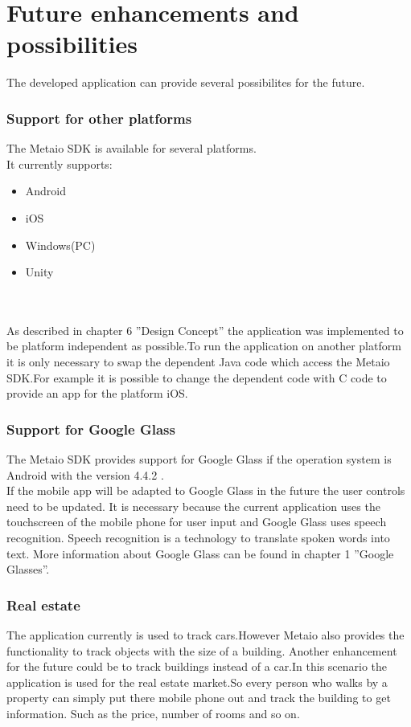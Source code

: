 \chapter{Future enhancements and possibilities} \label{chapter:Future enhancement and possibilities}

The developed application can provide several possibilites for the future.
\subsection{Support for other platforms}
The Metaio SDK is available for several platforms.  \\It currently supports:
\begin{itemize}
\item Android
\item iOS
\item Windows(PC)
\item Unity
\end{itemize}
 \cite{metaioPlatforms} 
        \\
        \\
As described in chapter 6 ''Design Concept'' the application was implemented to be platform independent as possible.To run the application on another platform it is only necessary to swap the dependent Java code which access the Metaio SDK.For example it is possible to change the dependent code with C code to provide an app for the platform iOS. 


\newpage
\subsection{Support for Google Glass}
The Metaio SDK provides support for Google Glass if the operation system is Android with the version 4.4.2 .\cite{metaioGlass}\\
If the mobile app will be adapted to Google Glass in the future the user controls need to be updated. It is necessary because the current application  uses the touchscreen of the mobile phone  for user input and Google Glass uses speech recognition. Speech recognition is a technology to translate spoken words into text.    
More information about Google Glass can be found in  chapter 1 ''Google Glasses''.   
\subsection{Real estate}
The application currently is used to track cars.However Metaio also provides the functionality to track objects with the size of a building. Another enhancement for the future could be to track buildings instead of a car.In this scenario the application is used for the real estate market.So every person who walks by a property can simply put there mobile phone out and track the building to get information. Such as the price, number of rooms and so on.    
  
\newpage